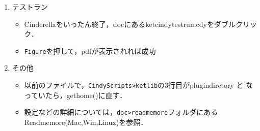 \documentclass{ujarticle}
\begin{document}
\begin{enumerate}[\bf\large 1.]
\vspace{71mm}

\item テストラン\vspace{-2mm}

\begin{itemize}
 \item Cinderellaをいったん終了，docにあるketcindytestrun.cdyをダブルクリック．
\item\verb|Figure|を押して，pdfが表示されれば成功
\end{itemize}

\item  その他
\begin{itemize}
\item 以前のファイルで，\verb|CindyScripts>ketlib|の3行目がplugindirctory と
なっていたら，gethome()に直す．
\item 設定などの詳細については，\verb|doc>readmemore|フォルダにあるReadmemore(Mac,Win,Linux)を参照．
\end{itemize}
\end{enumerate}
\end{document}
